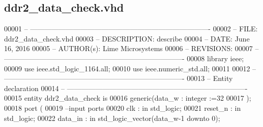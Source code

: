 \subsection{ddr2\+\_\+data\+\_\+check.\+vhd}
\label{ddr2__data__check_8vhd_source}

\begin{DoxyCode}
00001 \textcolor{keyword}{-- ---------------------------------------------------------------------------- }
00002 \textcolor{keyword}{-- FILE:    ddr2\_data\_check.vhd}
00003 \textcolor{keyword}{-- DESCRIPTION: describe}
00004 \textcolor{keyword}{-- DATE:    June 16, 2016}
00005 \textcolor{keyword}{-- AUTHOR(s):   Lime Microsystems}
00006 \textcolor{keyword}{-- REVISIONS:}
00007 \textcolor{keyword}{-- ---------------------------------------------------------------------------- }
00008 \textcolor{vhdlkeyword}{library }\textcolor{keywordflow}{ieee};
00009 \textcolor{vhdlkeyword}{use }ieee.std\_logic\_1164.\textcolor{keywordflow}{all};
00010 \textcolor{vhdlkeyword}{use }ieee.numeric\_std.\textcolor{keywordflow}{all};
00011 
00012 \textcolor{keyword}{-- ----------------------------------------------------------------------------}
00013 \textcolor{keyword}{-- Entity declaration}
00014 \textcolor{keyword}{-- ----------------------------------------------------------------------------}
00015 \textcolor{keywordflow}{entity }ddr2_data_check \textcolor{keywordflow}{is}
00016     \textcolor{keywordflow}{generic}\textcolor{vhdlchar}{(}\textcolor{vhdlchar}{data_w}      \textcolor{vhdlchar}{:} \textcolor{comment}{integer} \textcolor{vhdlchar}{:=}\textcolor{vhdllogic}{}\textcolor{vhdllogic}{32}
00017             \textcolor{vhdlchar}{)};
00018   \textcolor{keywordflow}{port} \textcolor{vhdlchar}{(}
00019 \textcolor{keyword}{      --input ports }
00020       \textcolor{vhdlchar}{clk}               \textcolor{vhdlchar}{:} \textcolor{keywordflow}{in} \textcolor{comment}{std\_logic};
00021       \textcolor{vhdlchar}{reset_n}           \textcolor{vhdlchar}{:} \textcolor{keywordflow}{in} \textcolor{comment}{std\_logic};
00022         \textcolor{vhdlchar}{data_in}         \textcolor{vhdlchar}{:} \textcolor{keywordflow}{in} \textcolor{comment}{std\_logic\_vector}\textcolor{vhdlchar}{(}\textcolor{vhdlchar}{data_w}\textcolor{vhdlchar}{-}\textcolor{vhdllogic}{}\textcolor{vhdllogic}{1} \textcolor{keywordflow}{downto} \textcolor{vhdllogic}{}\textcolor{vhdllogic}{0}\textcolor{vhdlchar}{)};

\end{DoxyCode}
